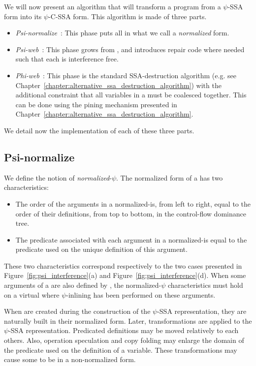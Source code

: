 We will now present an algorithm that will transform a program from a
$\psi$-SSA form into its $\psi$-C-SSA form. This algorithm is made of
three parts.

\begin{itemize}
\item \emph{Psi-normalize}~: This phase puts all \psifuns
in what we call a {\em normalized} form.
\item \emph{Psi-web}~: This phase grows \psiwebs from \psifuns, and introduces repair code where needed such that each \psiweb is interference free.
\item \emph{Phi-web}~: This phase is the standard SSA-destruction algorithm (e.g. see Chapter~\ref{chapter:alternative_ssa_destruction_algorithm}) with the additional constraint that all variables in a \psiweb must be coalesced together. This can be done using the pining mechanism presented in Chapter~\ref{chapter:alternative_ssa_destruction_algorithm}. 
\end{itemize}

We detail now the implementation of each of these three parts.

\subsection{Psi-normalize}

We define the notion of {\em normalized}-$\psi$. The normalized form of a \psifun has two characteristics:

\begin{itemize}
\item The order of the arguments in a normalized-\psifun is,
from left to right, equal to the order of their definitions, from top
to bottom, in the control-flow dominance tree.
\item The predicate associated with each argument in a
normalized-\psifun is equal to the predicate used on the
unique definition of this argument.
\end{itemize}

These two characteristics correspond respectively to the two cases
presented in Figure~\ref{fig:psi_interference}(a) and
Figure~\ref{fig:psi_interference}(d).
When some arguments of a \psifun are also defined by \psifuns, the {normalized}-$\psi$ characteristics must hold on a
virtual \psifun where $\psi$-inlining has been performed on
these arguments.

When \psifuns
are created during the construction of the $\psi$-SSA representation,
they are naturally built in their normalized form. Later,
transformations are applied to the $\psi$-SSA representation.
Predicated definitions may be moved relatively to each others. Also,
operation speculation and copy folding may enlarge the domain of the
predicate used on the definition of a variable. These transformations
may cause some \psifuns to be in a non-normalized form.




